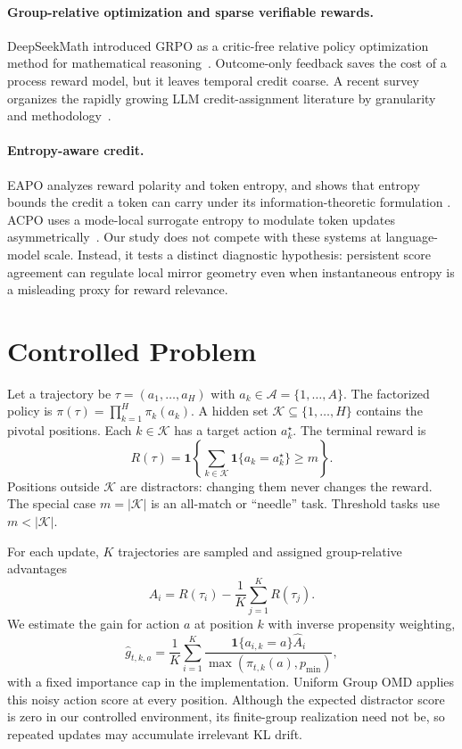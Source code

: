 \documentclass[10pt]{article}
\newcommand{\A}{\mathcal{A}}
\begin{document}
\paragraph{Group-relative optimization and sparse verifiable rewards.}
DeepSeekMath introduced GRPO as a critic-free relative policy optimization
method for mathematical reasoning~\cite{shao2024deepseekmath}.  Outcome-only
feedback saves the cost of a process reward model, but it leaves temporal credit
coarse.  A recent survey organizes the rapidly growing LLM credit-assignment
literature by granularity and methodology~\cite{zhang2026survey}.

\paragraph{Entropy-aware credit.}
EAPO analyzes reward polarity and token entropy, and shows that entropy bounds
the credit a token can carry under its information-theoretic formulation
\cite{he2026eapo}.  ACPO uses a mode-local surrogate entropy to modulate token
updates asymmetrically~\cite{xie2026acpo}.  Our study does not compete with
these systems at language-model scale.  Instead, it tests a distinct diagnostic
hypothesis: persistent score agreement can regulate local mirror geometry even
when instantaneous entropy is a misleading proxy for reward relevance.

\section{Controlled Problem}

Let a trajectory be $\tau=(a_1,\ldots,a_H)$ with
$a_k\in\A=\{1,\ldots,A\}$.  The factorized policy is
$\pi(\tau)=\prod_{k=1}^{H}\pi_k(a_k)$.  A hidden set
$\mathcal{K}\subseteq\{1,\ldots,H\}$ contains the pivotal positions.  Each
$k\in\mathcal{K}$ has a target action $a_k^\star$.  The terminal reward is
\begin{equation}
R(\tau)=\mathbf{1}\!\left\{
\sum_{k\in\mathcal{K}}\mathbf{1}\{a_k=a_k^\star\}\ge m
\right\}.
\label{eq:reward}
\end{equation}
Positions outside $\mathcal{K}$ are distractors: changing them never changes
the reward.  The special case $m=|\mathcal{K}|$ is an all-match or ``needle''
task.  Threshold tasks use $m<|\mathcal{K}|$.

For each update, $K$ trajectories are sampled and assigned group-relative
advantages
\begin{equation}
\widehat A_i=R(\tau_i)-\frac{1}{K}\sum_{j=1}^{K}R(\tau_j).
\label{eq:group_advantage}
\end{equation}
We estimate the gain for action $a$ at position $k$ with inverse propensity
weighting,
\begin{equation}
\widehat g_{t,k,a}=
\frac{1}{K}\sum_{i=1}^{K}
\frac{\mathbf{1}\{a_{i,k}=a\}\widehat A_i}
{\max(\pi_{t,k}(a),p_{\min})},
\label{eq:score}
\end{equation}
with a fixed importance cap in the implementation.  Uniform Group OMD applies
this noisy action score at every position.  Although the expected distractor
score is zero in our controlled environment, its finite-group realization need
not be, so repeated updates may accumulate irrelevant KL drift.
\end{document}
